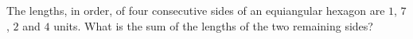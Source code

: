 The lengths, in order, of four consecutive sides of an equiangular hexagon are $1$, $7$, $2$ and $4$ units. What is the sum of the lengths of the two remaining sides?
